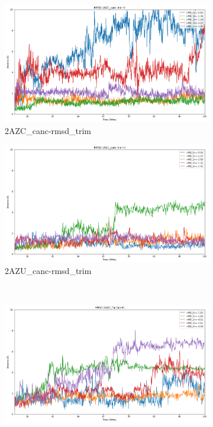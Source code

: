 \documentclass[fleqn,10pt]{wlscirep}
\begin{document}
\begin{figure}[!ht]
\centering
   \begin{subfigure}{.45\textwidth}
     \centering
     \includegraphics[width=.95\linewidth]{2AZC_canc/2AZC_canc-rmsd-trim.png}
     \caption{2AZC_{canc}-rmsd_trim}
     \label{fig:2AZC_canc-rmsd_trim}
   \end{subfigure}
   \begin{subfigure}{.45\textwidth}
     \centering
     \includegraphics[width=.95\linewidth]{2AZU_canc/2AZU_canc-rmsd-trim.png}
     \caption{2AZU_{canc}-rmsd_trim}
     \label{fig:2AZU_canc-rmsd_trim}
   \end{subfigure}
   \\
   \begin{subfigure}{.45\textwidth}
     \centering
     \includegraphics[width=.95\linewidth]{2AZC_flip/2AZC_flip-rmsd-trim.png}

\end{subfigure}
\end{figure}
\end{document}
